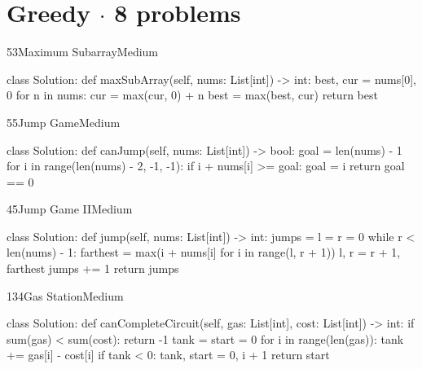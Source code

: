 \section{Greedy {\normalsize\color{muted}$\cdot$ 8 problems}}

\begin{problem}{53}{Maximum Subarray}{Medium}
\begin{code}
class Solution:
    def maxSubArray(self, nums: List[int]) -> int:
        best, cur = nums[0], 0
        for n in nums:
            cur = max(cur, 0) + n
            best = max(best, cur)
        return best
\end{code}
\end{problem}

\begin{problem}{55}{Jump Game}{Medium}
\begin{code}
class Solution:
    def canJump(self, nums: List[int]) -> bool:
        goal = len(nums) - 1
        for i in range(len(nums) - 2, -1, -1):
            if i + nums[i] >= goal:
                goal = i
        return goal == 0
\end{code}
\end{problem}

\begin{problem}{45}{Jump Game II}{Medium}
\begin{code}
class Solution:
    def jump(self, nums: List[int]) -> int:
        jumps = l = r = 0
        while r < len(nums) - 1:
            farthest = max(i + nums[i] for i in range(l, r + 1))
            l, r = r + 1, farthest
            jumps += 1
        return jumps
\end{code}
\end{problem}

\begin{problem}{134}{Gas Station}{Medium}
\begin{code}
class Solution:
    def canCompleteCircuit(self, gas: List[int], cost: List[int]) -> int:
        if sum(gas) < sum(cost):
            return -1
        tank = start = 0
        for i in range(len(gas)):
            tank += gas[i] - cost[i]
            if tank < 0:
                tank, start = 0, i + 1
        return start
\end{code}
\end{problem}


